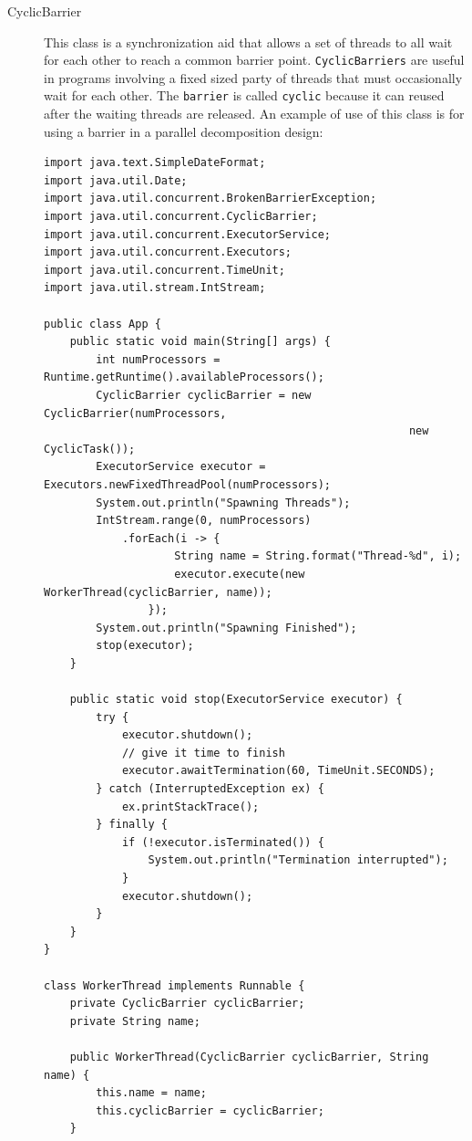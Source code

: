 \documentclass{latex/classes/thesis}
\begin{document}
\begin{description}
\item[{CyclicBarrier}] This class is a synchronization aid that allows a set of
threads to all wait for each other to reach a common barrier
point. \texttt{CyclicBarriers} are useful in programs involving a fixed sized party
of threads that must occasionally wait for each other. The \texttt{barrier} is
called \texttt{cyclic} because it can reused after the waiting threads are
released. An example of use of this class is for using a barrier in a
parallel decomposition design:

\begin{lstlisting}
import java.text.SimpleDateFormat;
import java.util.Date;
import java.util.concurrent.BrokenBarrierException;
import java.util.concurrent.CyclicBarrier;
import java.util.concurrent.ExecutorService;
import java.util.concurrent.Executors;
import java.util.concurrent.TimeUnit;
import java.util.stream.IntStream;

public class App {
    public static void main(String[] args) {
        int numProcessors = Runtime.getRuntime().availableProcessors();
        CyclicBarrier cyclicBarrier = new CyclicBarrier(numProcessors,
                                                        new CyclicTask());
        ExecutorService executor = Executors.newFixedThreadPool(numProcessors);
        System.out.println("Spawning Threads");
        IntStream.range(0, numProcessors)
            .forEach(i -> {
                    String name = String.format("Thread-%d", i);
                    executor.execute(new WorkerThread(cyclicBarrier, name));
                });
        System.out.println("Spawning Finished");
        stop(executor);
    }

    public static void stop(ExecutorService executor) {
        try {
            executor.shutdown();
            // give it time to finish
            executor.awaitTermination(60, TimeUnit.SECONDS);
        } catch (InterruptedException ex) {
            ex.printStackTrace();
        } finally {
            if (!executor.isTerminated()) {
                System.out.println("Termination interrupted");
            }
            executor.shutdown();
        }
    }
}

class WorkerThread implements Runnable {
    private CyclicBarrier cyclicBarrier;
    private String name;

    public WorkerThread(CyclicBarrier cyclicBarrier, String name) {
        this.name = name;
        this.cyclicBarrier = cyclicBarrier;
    }


\end{lstlisting}
\end{description}
\end{document}

